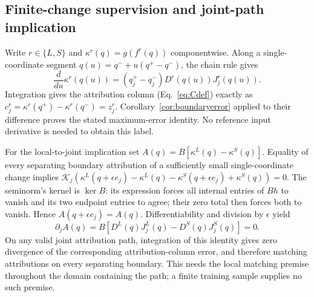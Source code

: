 \subsection{Finite-change supervision and joint-path implication}\label{app:pairproof}
\begin{pf}
Write $r\in\{L,S\}$ and $\kappa^r(q)=g(f^r(q))$ componentwise. Along a
single-coordinate segment $q(u)=q^-+u(q^+-q^-)$, the chain rule gives
\[
\frac{d}{du}\kappa^r(q(u))=(q_j^+-q_j^-)
D^r(q(u))J_j^r(q(u)).
\]
Integration gives the attribution column (Eq.~\eqref{eq:Cdef}) exactly
as $c_j^r=\kappa^r(q^+)-\kappa^r(q^-)=z_j^r$.
Corollary~\ref{cor:boundaryerror} applied to their difference proves
the stated maximum-error identity. No reference input derivative is
needed to obtain this label.

For the local-to-joint implication set
$A(q)=B[\kappa^L(q)-\kappa^S(q)]$. Equality of every separating boundary
attribution of a sufficiently small single-coordinate change implies
$\mathcal K_j(\kappa^L(q+\epsilon e_j)-\kappa^L(q)
-\kappa^S(q+\epsilon e_j)+\kappa^S(q))=0$.
The seminorm's kernel is $\ker B$: its expression forces all internal
entries of $Bh$ to vanish and its two endpoint entries to agree; their
zero total then forces both to vanish. Hence
$A(q+\epsilon e_j)=A(q)$. Differentiability and division by $\epsilon$
yield
\[
\partial_j A(q)=B[D^L(q)J_j^L(q)-D^S(q)J_j^S(q)]=0.
\]
On any valid joint attribution path, integration of this identity gives
zero divergence of the corresponding attribution-column error, and
therefore matching attributions on every separating boundary. This needs
the local matching premise throughout the domain containing the path;
a finite training sample supplies no such premise.
\end{pf}
